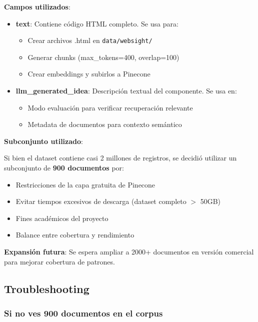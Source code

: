 \documentclass[12pt,a4paper]{article}
\begin{document}
\textbf{Campos utilizados}:

\begin{itemize}
    \item \textbf{text}: Contiene código HTML completo. Se usa para:
    \begin{itemize}
        \item Crear archivos .html en \texttt{data/websight/}
        \item Generar chunks (max\_tokens=400, overlap=100)
        \item Crear embeddings y subirlos a Pinecone
    \end{itemize}
    
    \item \textbf{llm\_generated\_idea}: Descripción textual del componente. Se usa en:
    \begin{itemize}
        \item Modo evaluación para verificar recuperación relevante
        \item Metadata de documentos para contexto semántico
    \end{itemize}
\end{itemize}

\textbf{Subconjunto utilizado}:

Si bien el dataset contiene casi 2 millones de registros, se decidió utilizar un subconjunto de \textbf{900 documentos} por:

\begin{itemize}
    \item Restricciones de la capa gratuita de Pinecone
    \item Evitar tiempos excesivos de descarga (dataset completo $>$ 50GB)
    \item Fines académicos del proyecto
    \item Balance entre cobertura y rendimiento
\end{itemize}

\textbf{Expansión futura}: Se espera ampliar a 2000+ documentos en versión comercial para mejorar cobertura de patrones.

\subsection{Troubleshooting}

\subsubsection{Si no ves 900 documentos en el corpus}
\end{document}
